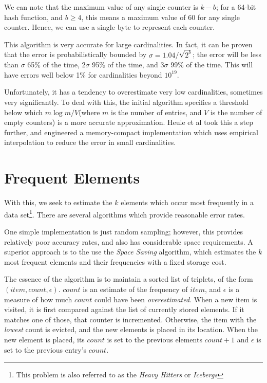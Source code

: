 We can note that the maximum value of any single counter is $k-b$; for a 64-bit hash function, and $b\geq 4$, this means a maximum value of 60 for any single counter. Hence, we can use a single byte to represent each counter.

This algorithm is very accurate for large cardinalities. In fact, it can be proven that the error is probabilistically bounded by $\sigma = 1.04/\sqrt{2^b}$; the error will be less than $\sigma$ 65\% of the time, $2\sigma$ 95\% of the time, and $3\sigma$ 99\% of the time. This will have errors well below 1\% for cardinalities beyond $10^{19}$\cite{Flajolet07hyperloglog:the}.

Unfortunately, it has a tendency to overestimate very low cardinalities, sometimes very significantly. To deal with this, the initial algorithm specifies a threshold below which $m \log{m/V}$(where $m$ is the number of entries, and $V$ is the number of empty counters) is a more accurate approximation. Heule et al\cite{HyperLogLogGoogle} took this a step further, and engineered a memory-compact implementation which uses empirical interpolation to reduce the error in small cardinalities. 

\section{Frequent Elements}
\label{sec:SpaceSaver}
With this, we seek to estimate the $k$ elements which occur most frequently in a data set\footnote{This problem is also referred to as the \emph{Heavy Hitters} or \emph{Icebergs}}. There are several algorithms which provide reasonable error rates.

One simple implementation is just random sampling; however, this provides relatively poor accuracy rates, and also has considerable space requirements. A superior approach is to the use the \emph{Space Saving} algorithm\cite{SpaceSaver}, which estimates the $k$ most frequent elements and their frequencies with a fixed storage cost.

The essence of the algorithm is to maintain a sorted list of triplets, of the form $(item,count,\epsilon)$. $count$ is an estimate of the frequency of $item$, and $\epsilon$ is a measure of how much $count$ could have been \emph{overestimated}. When a new item is visited, it is first compared against the list of currently stored elements. If it matches one of those, that counter is incremented. Otherwise, the item with the \emph{lowest} count is evicted, and the new elements is placed in its location. When the new element is placed, its $count$ is set to the previous elements $count+1$ and $\epsilon$ is set to the previous entry's $count$.

